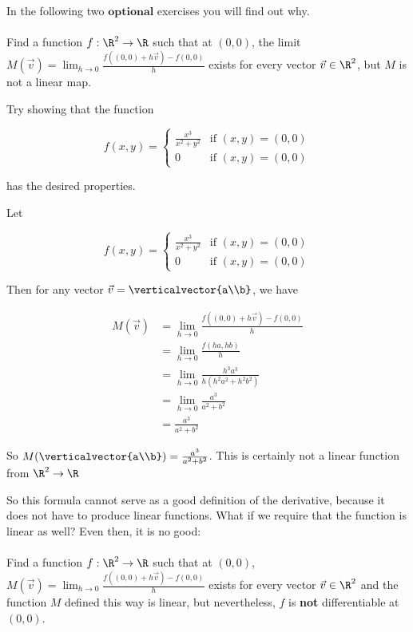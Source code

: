 \documentclass{ximera}
\begin{document}
	In the following two $\textbf{optional}$ exercises you will find out why.
	\\
	\\
	Find a function $f:\R^2\to \R$ such that at $(0,0)$, the limit $M(\vec{v}) = \lim_{h \to 0}\frac{f((0,0)+h\vec{v}) - f(0,0)}{h}$ exists for every vector $\vec{v} \in \R^2$, but 
	$M$ is not a linear map.
	
	\begin{hint}
		Try showing that the function 
		
		\[f(x,y) = \begin{cases} 
			\frac{x^3}{x^2+y^2} & \text{if $(x,y) = (0,0)$} \\
			0 & \text{if $(x,y) = (0,0)$}
			\end{cases}\] 
			
			has the desired properties.
	\end{hint}
	\begin{free-response}
		Let 
		
		\[f(x,y) = \begin{cases} 
			\frac{x^3}{x^2+y^2} & \text{if $(x,y) = (0,0)$} \\
			0 & \text{if $(x,y) = (0,0)$}
			\end{cases}\] 
			
		Then for any vector $\vec{v} = \verticalvector{a\\b}$, we have 
		
		\begin{align*}
			M(\vec{v}) &= \lim_{h \to 0}\frac{f((0,0)+h\vec{v}) - f(0,0)}{h}\\
							&= \lim_{h \to 0}\frac{f(ha,hb)}{h}\\
							&=\lim_{h \to 0}\frac{h^3a^3}{h(h^2a^2+h^2b^2)}\\
							&=\lim_{h \to 0}\frac{a^3}{a^2+b^2}\\
							&=\frac{a^3}{a^2+b^2}
		\end{align*}
		
		So $M(\verticalvector{a\\b}) = \frac{a^3}{a^2+b^2}$.  This is certainly not a linear function from $\R^2 \to \R$
			
	\end{free-response}
	
	So this formula cannot serve as a good definition of the derivative, because it does not have to produce linear functions.  What if we require that the function is linear as well?
	Even then, it is no good:
	\\
	\\
	Find a function $f:\R^2 \to \R$ such that at $(0,0)$, $M(\vec{v}) = \lim_{h \to 0}\frac{f((0,0)+h\vec{v}) - f(0,0)}{h}$ exists for every vector $\vec{v} \in \R^2$ and 
	the function $M$ defined this way is linear, but nevertheless, $f$ is \textbf{not} differentiable at $(0,0)$.
	
\end{document}
